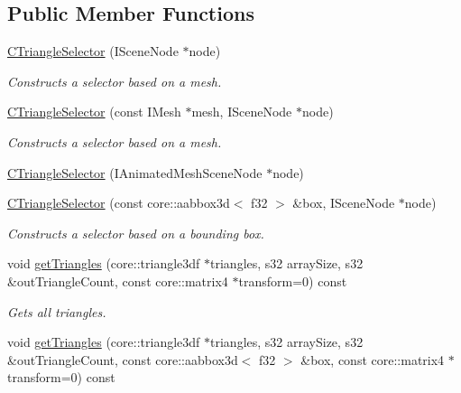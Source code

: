 \subsection*{Public Member Functions}
\begin{DoxyCompactItemize}
\item 
\hyperlink{classirr_1_1scene_1_1_c_triangle_selector_af9f3855903de12fc5308391fc2e32ed0}{C\-Triangle\-Selector} (I\-Scene\-Node $\ast$node)
\begin{DoxyCompactList}\small\item\em Constructs a selector based on a mesh. \end{DoxyCompactList}\item 
\hyperlink{classirr_1_1scene_1_1_c_triangle_selector_adea499f5dbc127472dad8004bc29809e}{C\-Triangle\-Selector} (const I\-Mesh $\ast$mesh, I\-Scene\-Node $\ast$node)
\begin{DoxyCompactList}\small\item\em Constructs a selector based on a mesh. \end{DoxyCompactList}\item 
\hyperlink{classirr_1_1scene_1_1_c_triangle_selector_a6b17eaa4661ca1f6224f1cfee7678562}{C\-Triangle\-Selector} (I\-Animated\-Mesh\-Scene\-Node $\ast$node)
\item 
\hyperlink{classirr_1_1scene_1_1_c_triangle_selector_acd0bc46a0c754e874aced3ca6638d7a9}{C\-Triangle\-Selector} (const core\-::aabbox3d$<$ f32 $>$ \&box, I\-Scene\-Node $\ast$node)
\begin{DoxyCompactList}\small\item\em Constructs a selector based on a bounding box. \end{DoxyCompactList}\item 
\hypertarget{classirr_1_1scene_1_1_c_triangle_selector_a84c55877e1fd217fef014d982d27d153}{void \hyperlink{classirr_1_1scene_1_1_c_triangle_selector_a84c55877e1fd217fef014d982d27d153}{get\-Triangles} (core\-::triangle3df $\ast$triangles, s32 array\-Size, s32 \&out\-Triangle\-Count, const core\-::matrix4 $\ast$transform=0) const }\label{classirr_1_1scene_1_1_c_triangle_selector_a84c55877e1fd217fef014d982d27d153}

\begin{DoxyCompactList}\small\item\em Gets all triangles. \end{DoxyCompactList}\item 
\hypertarget{classirr_1_1scene_1_1_c_triangle_selector_ae46e57d72123d74aa4e2647a92fe3c1d}{void \hyperlink{classirr_1_1scene_1_1_c_triangle_selector_ae46e57d72123d74aa4e2647a92fe3c1d}{get\-Triangles} (core\-::triangle3df $\ast$triangles, s32 array\-Size, s32 \&out\-Triangle\-Count, const core\-::aabbox3d$<$ f32 $>$ \&box, const core\-::matrix4 $\ast$transform=0) const }\label{classirr_1_1scene_1_1_c_triangle_selector_ae46e57d72123d74aa4e2647a92fe3c1d}


\end{DoxyCompactItemize}
